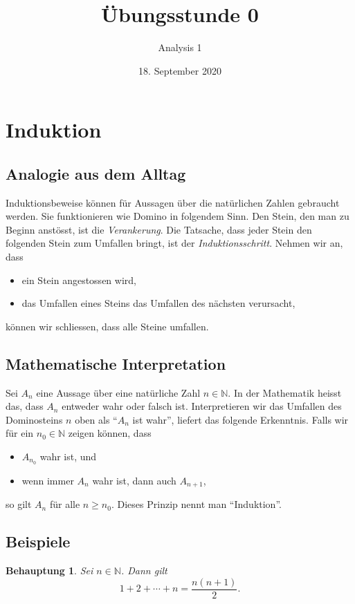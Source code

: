 \documentclass[12pt,a4paper]{article}
\title{Übungsstunde 0}
\author{Analysis 1}
\date{18. September 2020}
\newtheorem*{claim}{Behauptung}
\theoremstyle{definition}
\begin{document}
\maketitle
\section{Induktion}
\subsection*{Analogie aus dem Alltag}
Induktionsbeweise können für Aussagen
über die natürlichen Zahlen
gebraucht werden.
Sie funktionieren wie Domino
in folgendem Sinn.
Den Stein, den man zu Beginn anstösst,
ist die \textit{Verankerung}.
Die Tatsache, dass jeder Stein
den folgenden Stein zum Umfallen bringt,
ist der \textit{Induktionsschritt}.
Nehmen wir an, dass
\begin{itemize}
  \item ein Stein angestossen wird,
  \item das Umfallen eines Steins das Umfallen des nächsten verursacht,
\end{itemize}
können wir schliessen, dass alle Steine umfallen.

\subsection*{Mathematische Interpretation}
Sei $A_{n}$ eine Aussage über eine natürliche Zahl $n \in \mathbb N$.
In der Mathematik heisst das, dass $A_n$
entweder wahr oder falsch ist.
Interpretieren wir das Umfallen des Dominosteins $n$ oben
als ``$A_{n}$ ist wahr'', liefert das folgende Erkenntnis.
Falls wir für ein $n_{0} \in \mathbb N$ zeigen können,
dass
\begin{itemize}
  \item
    $A_{n_{0}}$ wahr ist, und
  \item
    wenn immer $A_{n}$ wahr ist, dann auch $A_{n+1}$,
\end{itemize}
so gilt $A_{n}$ für alle $n \geq n_{0}$.
Dieses Prinzip nennt man ``Induktion''.

\subsection*{Beispiele}
\begin{claim}
  Sei $n \in \mathbb N$. Dann gilt
  \[1 + 2 + \cdots + n = \frac{n(n+1)}{2}.\]
\end{claim}
\end{document}
